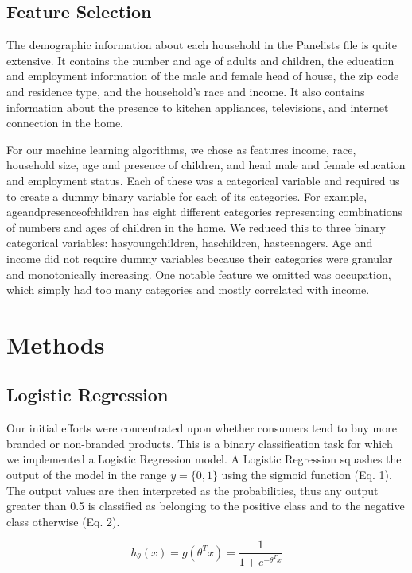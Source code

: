 \documentclass[conference]{IEEEtran}
\begin{document}
\subsection{Feature Selection}

The demographic information about each household in the Panelists file is quite extensive. It contains the number and age of adults and children, the education and employment information of the male and female head of house, the zip code and residence type, and the household’s race and income. It also contains information about the presence to kitchen appliances, televisions, and internet connection in the home.
	
	
For our machine learning algorithms, we chose as features income, race, household size, age and presence of children, and head male and female education and employment status. Each of these was a categorical variable and required us to create a dummy binary variable for each of its categories. For example, age\textunderscore and\textunderscore presence\textunderscore of\textunderscore children has eight different categories representing combinations of numbers and ages of children in the home. We reduced this to three binary categorical variables: has\textunderscore young\textunderscore children, has\textunderscore children, has\textunderscore teenagers. Age and income did not require dummy variables because their categories were granular and monotonically increasing. One notable feature we omitted was occupation, which simply had too many categories and mostly correlated with income.

\section{Methods}

\subsection{Logistic Regression}
Our initial efforts were concentrated upon whether consumers tend to buy more branded or non-branded products. This is a binary classification task for which we implemented a Logistic Regression model. A Logistic Regression squashes the output of the model in the range $y = \{0,1\} $  using the sigmoid function (Eq. 1). The output values are then interpreted as the probabilities, thus any output greater than 0.5 is classified as belonging to the positive class and to the negative class otherwise (Eq. 2).

\begin{equation}
h_\theta(x) = g(\theta^Tx) =  \frac{1}{1 + e^{-\theta^Tx}}
\end{equation}
\end{document}
